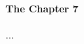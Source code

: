 \documentclass[12pt,usletter,fancy]{elegantbook}
\begin{document}
\paragraph*{The Chapter 7}...

% 
% 
% 
% 
\end{document}
